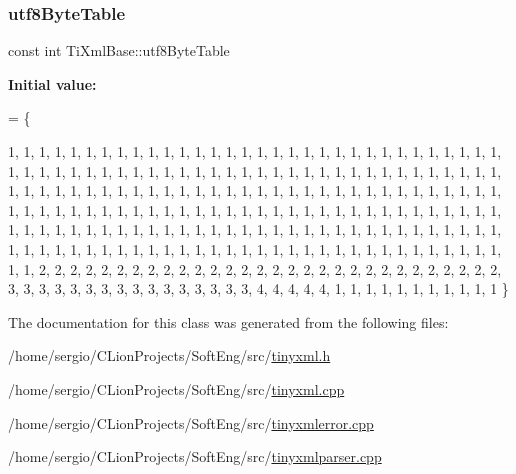 \subsubsection{\texorpdfstring{utf8\+Byte\+Table}{utf8ByteTable}}
{\footnotesize\ttfamily const int Ti\+Xml\+Base\+::utf8\+Byte\+Table\hspace{0.3cm}{\ttfamily [static]}}

{\bfseries Initial value\+:}
\begin{DoxyCode}
= 
\{
    
        1,  1,  1,  1,  1,  1,  1,  1,  1,  1,  1,  1,  1,  1,  1,  1,  
        1,  1,  1,  1,  1,  1,  1,  1,  1,  1,  1,  1,  1,  1,  1,  1,  
        1,  1,  1,  1,  1,  1,  1,  1,  1,  1,  1,  1,  1,  1,  1,  1,  
        1,  1,  1,  1,  1,  1,  1,  1,  1,  1,  1,  1,  1,  1,  1,  1,  
        1,  1,  1,  1,  1,  1,  1,  1,  1,  1,  1,  1,  1,  1,  1,  1,  
        1,  1,  1,  1,  1,  1,  1,  1,  1,  1,  1,  1,  1,  1,  1,  1,  
        1,  1,  1,  1,  1,  1,  1,  1,  1,  1,  1,  1,  1,  1,  1,  1,  
        1,  1,  1,  1,  1,  1,  1,  1,  1,  1,  1,  1,  1,  1,  1,  1,  
        1,  1,  1,  1,  1,  1,  1,  1,  1,  1,  1,  1,  1,  1,  1,  1,  
        1,  1,  1,  1,  1,  1,  1,  1,  1,  1,  1,  1,  1,  1,  1,  1,  
        1,  1,  1,  1,  1,  1,  1,  1,  1,  1,  1,  1,  1,  1,  1,  1,  
        1,  1,  1,  1,  1,  1,  1,  1,  1,  1,  1,  1,  1,  1,  1,  1,  
        1,  1,  2,  2,  2,  2,  2,  2,  2,  2,  2,  2,  2,  2,  2,  2,  
        2,  2,  2,  2,  2,  2,  2,  2,  2,  2,  2,  2,  2,  2,  2,  2,  
        3,  3,  3,  3,  3,  3,  3,  3,  3,  3,  3,  3,  3,  3,  3,  3,  
        4,  4,  4,  4,  4,  1,  1,  1,  1,  1,  1,  1,  1,  1,  1,  1   
\}
\end{DoxyCode}


The documentation for this class was generated from the following files\+:\begin{DoxyCompactItemize}
\item 
/home/sergio/\+C\+Lion\+Projects/\+Soft\+Eng/src/\hyperlink{tinyxml_8h}{tinyxml.\+h}\item 
/home/sergio/\+C\+Lion\+Projects/\+Soft\+Eng/src/\hyperlink{tinyxml_8cpp}{tinyxml.\+cpp}\item 
/home/sergio/\+C\+Lion\+Projects/\+Soft\+Eng/src/\hyperlink{tinyxmlerror_8cpp}{tinyxmlerror.\+cpp}\item 
/home/sergio/\+C\+Lion\+Projects/\+Soft\+Eng/src/\hyperlink{tinyxmlparser_8cpp}{tinyxmlparser.\+cpp}\end{DoxyCompactItemize}
